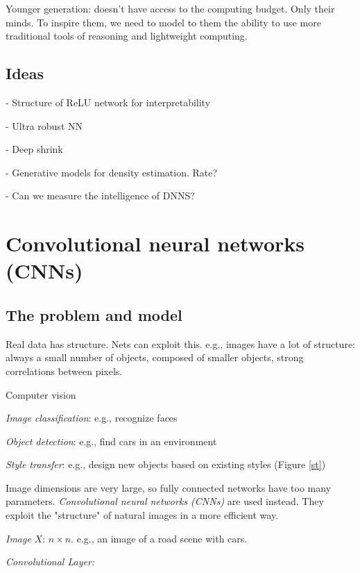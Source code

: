 \documentclass[english]{article}
\begin{document}
Younger generation: doesn't have access to the computing budget. Only their minds. To inspire them, we need to model to them the ability to use more traditional tools of reasoning and lightweight computing.


\eenum

\subsection{Ideas}
\benum
\item

- Structure of ReLU network for interpretability

- Ultra robust NN

- Deep shrink 

- Generative models for density estimation. Rate? 

- Can we measure the intelligence of DNNS? 
\eenum



\section{Convolutional neural networks (CNNs)}
\subsection{The problem and model}
\benum
\item Real data has structure. Nets can exploit this. e.g., images have a lot of structure: always a small number of objects, composed of smaller objects, strong correlations between pixels. 


Computer vision
\benum
\item \emph{Image classification}: e.g., recognize faces 
\item \emph{Object detection}: e.g., find cars in an environment
\item \emph{Style transfer}: e.g., design new objects based on existing styles (Figure \ref{st})

\eenum
Image dimensions are very large, so fully connected networks have too many parameters. \emph{Convolutional neural networks (CNNs)} are used instead. They exploit the "structure" of natural images in a more efficient way. 

\item \emph{Image} $X$: $n\times n$. e.g., an image of a road scene with cars.

\item \emph{Convolutional Layer:} 
\end{document}
